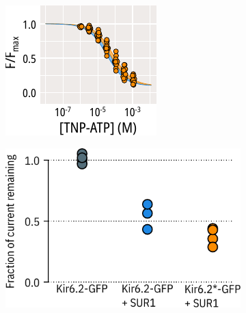 \begin{figure}[h]
\begin{subfigure}[t]{0.45\textwidth}
	\end{subfigure}
	\vfill
	\begin{subfigure}[t]{0.45\textwidth}
		\caption{}\label{ch6fig:nosur_unroofed}
		\centering
		\includegraphics[width=\textwidth]{nosur_unroofed.pdf}
	\end{subfigure}
	\hfill
	\begin{subfigure}[t]{0.45\textwidth}
		\caption{}\label{ch6fig:tolb_inhibition_1}
		\centering
		\includegraphics[width=\textwidth]{tolb_inhibition_1.pdf}
	\end{subfigure}
	\vfill
	\begin{subfigure}[t]{0.9\textwidth}
		\caption{}\label{ch6fig:nosur_ec50s}

\end{subfigure}
\end{figure}
